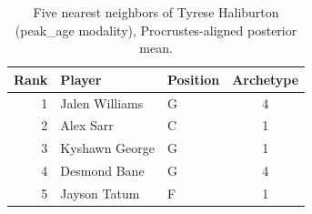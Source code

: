 \begin{table}[htbp]
  \centering\small
  \begin{tabular}{rllc}
    \toprule
    Rank & Player & Position & Archetype \\
    \midrule
    1 & Jalen Williams & G & 4 \\
    2 & Alex Sarr & C & 1 \\
    3 & Kyshawn George & G & 1 \\
    4 & Desmond Bane & G & 4 \\
    5 & Jayson Tatum & F & 1 \\
    \bottomrule
  \end{tabular}
  \caption{Five nearest neighbors of Tyrese Haliburton (peak_age modality), Procrustes-aligned posterior mean.}
  \label{tab:Tyrese_Haliburton_neighbors_peak_age}
\end{table}


